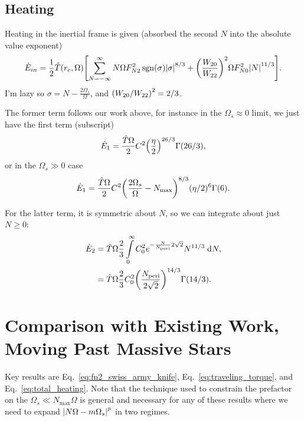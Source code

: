 \documentclass[11pt,
        usenames, %
        dvipsnames %
    ]{article}
\DeclareMathOperator{\sgn}{sgn}
\DeclarePairedDelimiter\abs{\lvert}{\rvert}
\DeclarePairedDelimiter\p{\lparen}{\rparen}
\DeclarePairedDelimiter\s{\lbrack}{\rbrack}
\begin{document}
\subsection{Heating}

Heating in the inertial frame is given (absorbed the second $N$ into the
absolute value exponent)
\begin{align}
     \dot{E}_{in} = \frac{1}{2}\hat{T}\p*{r_c, \Omega}\s*{
         \sum\limits_{N = -\infty}^\infty
            N\Omega F_{N2}^2 \sgn \p*{\sigma} \abs*{\sigma}^{8/3}
            + \p*{\frac{W_{20}}{W_{22}}}^2\Omega F_{N0}^2 \abs*{N}^{11/3}}.
\end{align}
I'm lazy so $\sigma = N - \frac{2\Omega_s}{\Omega}$, and $\p*{W_{20} /
W_{22}}^2 = 2/3$.

The former term follows our work above, for instance in the $\Omega_s \approx 0$
limit, we just have the first term (subscript)
\begin{equation}
    \dot{E}_1 = \frac{\hat{T}\Omega }{2} C^2
        \p*{\frac{\eta}{2}}^{26/3}\Gamma\p*{26/3},
\end{equation}
or in the $\Omega_s \gg 0$ case
\begin{equation}
    \dot{E}_1 = \frac{\hat{T}\Omega}{2} C^2
        \p*{\frac{2\Omega_s}{\Omega} - N_{\max}}^{8/3}
            (\eta/2)^{6} \Gamma\p*{6}.
\end{equation}

For the latter term, it is symmetric about $N$, so we can integrate about just
$N \geq 0$:
\begin{align}
    \dot{E}_2 &= \hat{T}\Omega \frac{2}{3} \int\limits_0^\infty
            C_0^2 e^{-\frac{N}{N_{\rm peri}}2\sqrt{2}}N^{11/3}\;\mathrm{d}N,\\
        &= \hat{T} \Omega \frac{2}{3} C_0^2
            \p*{\frac{N_{\rm peri}}{2\sqrt{2}}}^{14/3}
            \Gamma\p*{14/3}.
\end{align}

\section{Comparison with Existing Work, Moving Past Massive Stars}

Key results are Eq.~\eqref{eq:fn2_swiss_army_knife},
Eq.~\eqref{eq:traveling_torque}, and Eq.~\eqref{eq:total_heating}. Note that the
technique used to constrain the prefactor on the $\Omega_s \ll N_{\max}\Omega$
is general and necessary for any of these results where we need to expand
$\abs*{N\Omega - m\Omega_s}^p$ in two regimes.
\end{document}
